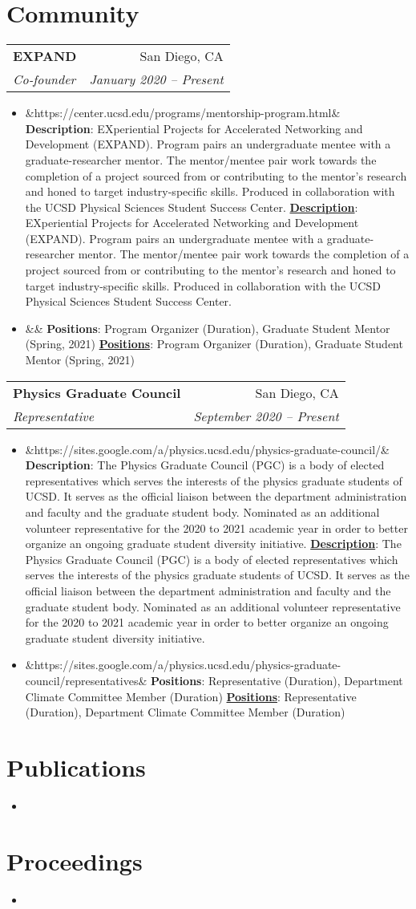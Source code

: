 \documentclass[letterpaper,11pt]{article}
\makeatletter
\newcommand{\Item}[3]{
  \item\small{
    \ifx&#1&
      \textbf{#2}{: #3 \vspace{-2pt}}
    \else
      \textbf{\href{#1}{#2}}{: #3 \vspace{-2pt}}
    \fi
  }
}
\newcommand{\Subheading}[4]{
  \vspace{-1pt}\item
    \begin{tabular*}{0.97\textwidth}{l@{\extracolsep{\fill}}r}
      \textbf{#1} & #2 \\
      \textit{\small#3} & \textit{\small #4} \\
    \end{tabular*}\vspace{-5pt}
}
\newcommand{\Section}[2]{
    \section{\texorpdfstring{#1}{o} #2}
}
\newcommand{\SubHeadingListStart}{\begin{description}[leftmargin=*]}
\newcommand{\SubHeadingListEnd}{\end{description}}
\newcommand{\ItemListStart}{\begin{itemize}}
\newcommand{\ItemListEnd}{\end{itemize}\vspace{-5pt}}
\makeatother
\begin{document}
\Section{\faGroup}{Community}
  \SubHeadingListStart
      \Subheading
      {EXPAND}{San Diego, CA}
      {Co-founder}{January 2020 -- Present}
      \ItemListStart
        \Item{https://center.ucsd.edu/programs/mentorship-program.html}{Description}
          {EXperiential Projects for Accelerated Networking and Development (EXPAND).  Program pairs an undergraduate mentee with a graduate-researcher mentor. The mentor/mentee pair work towards the completion of a project sourced from or contributing to the mentor's research and honed to target industry-specific skills. Produced in collaboration with the UCSD Physical Sciences Student Success Center.}
        \Item{}{Positions}
            {Program Organizer (Duration), Graduate Student Mentor (Spring, 2021)}
      \ItemListEnd
      \Subheading
      {Physics Graduate Council}{San Diego, CA}
      {Representative}{September 2020 -- Present}
      \ItemListStart
        \Item{https://sites.google.com/a/physics.ucsd.edu/physics-graduate-council/}{Description}
          {The Physics Graduate Council (PGC) is a body of elected representatives which serves the interests of the physics graduate students of UCSD. It serves as the official liaison between the department administration and faculty and the graduate student body. Nominated as an  additional volunteer representative for the 2020 to 2021 academic year in order to better organize an ongoing graduate student diversity initiative.}
        \Item{https://sites.google.com/a/physics.ucsd.edu/physics-graduate-council/representatives}{Positions}
            {Representative (Duration), Department Climate Committee Member (Duration)}
      \ItemListEnd
  \SubHeadingListEnd
%


\Section{\faPencilSquareO}{Publications}
  \begin{itemize}
      \item {}
  \end{itemize}

\Section{\faArchive}{Proceedings}
  \begin{itemize}
      \item {}
  \end{itemize}
  
\end{document}
